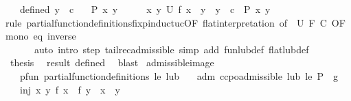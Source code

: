 \begin{isabellebody}
\ \ \ defined{\isacharcolon}{\kern0pt}\ {\isachardoublequoteopen}y\ {\isasymnoteq}\ c{\isachardoublequoteclose}\isanewline
\ \ \ {\isachardoublequoteopen}P\ x\ y{\isachardoublequoteclose}\isanewline
%
\isadelimproof
%
\endisadelimproof
%
\isatagproof
{}\isamarkupfalse%
\ {\isacharminus}{\kern0pt}\isanewline
\ \ \isamarkupfalse%
\ {\isachardoublequoteopen}{\isasymforall}x\ y{\isachardot}{\kern0pt}\ U\ f\ x\ {\isacharequal}{\kern0pt}\ y\ {\isasymlongrightarrow}\ y\ {\isasymnoteq}\ c\ {\isasymlongrightarrow}\ P\ x\ y{\isachardoublequoteclose}\isanewline
\ \ \ \ \isamarkupfalse%
{\isacharparenleft}{\kern0pt}rule\ partial{\isacharunderscore}{\kern0pt}function{\isacharunderscore}{\kern0pt}definitions{\isachardot}{\kern0pt}fixp{\isacharunderscore}{\kern0pt}induct{\isacharunderscore}{\kern0pt}uc{\isacharbrackleft}{\kern0pt}OF\ flat{\isacharunderscore}{\kern0pt}interpretation{\isacharcomma}{\kern0pt}\ of\ {\isacharunderscore}{\kern0pt}\ U\ F\ C{\isacharcomma}{\kern0pt}\ OF\ mono\ eq\ inverse{}{\isacharbrackright}{\kern0pt}{\isacharparenright}{\kern0pt}\isanewline
\ \ \ \ \ \ {\isacharparenleft}{\kern0pt}auto\ intro{\isacharcolon}{\kern0pt}\ step\ tailrec{\isacharunderscore}{\kern0pt}admissible\ simp\ add{\isacharcolon}{\kern0pt}\ fun{\isacharunderscore}{\kern0pt}lub{\isacharunderscore}{\kern0pt}def\ flat{\isacharunderscore}{\kern0pt}lub{\isacharunderscore}{\kern0pt}def{\isacharparenright}{\kern0pt}\isanewline
\ \ \isamarkupfalse%
\ {\isacharquery}{\kern0pt}thesis\ \isamarkupfalse%
\ result\ defined\ \isamarkupfalse%
\ blast\isanewline
{}\isamarkupfalse%
%
\endisatagproof
{\isafoldproof}%
%
\isadelimproof
\isanewline
%
\endisadelimproof
\isanewline
{}\isamarkupfalse%
\ admissible{\isacharunderscore}{\kern0pt}image{\isacharcolon}{\kern0pt}\isanewline
\ \ \ pfun{\isacharcolon}{\kern0pt}\ {\isachardoublequoteopen}partial{\isacharunderscore}{\kern0pt}function{\isacharunderscore}{\kern0pt}definitions\ le\ lub{\isachardoublequoteclose}\isanewline
\ \ \ adm{\isacharcolon}{\kern0pt}\ {\isachardoublequoteopen}ccpo{\isachardot}{\kern0pt}admissible\ lub\ le\ {\isacharparenleft}{\kern0pt}P\ {\isasymcirc}\ g{\isacharparenright}{\kern0pt}{\isachardoublequoteclose}\isanewline
\ \ \ inj{\isacharcolon}{\kern0pt}\ {\isachardoublequoteopen}{\isasymAnd}x\ y{\isachardot}{\kern0pt}\ f\ x\ {\isacharequal}{\kern0pt}\ f\ y\ {\isasymLongrightarrow}\ x\ {\isacharequal}{\kern0pt}\ y{\isachardoublequoteclose}\isanewline

\end{isabellebody}

